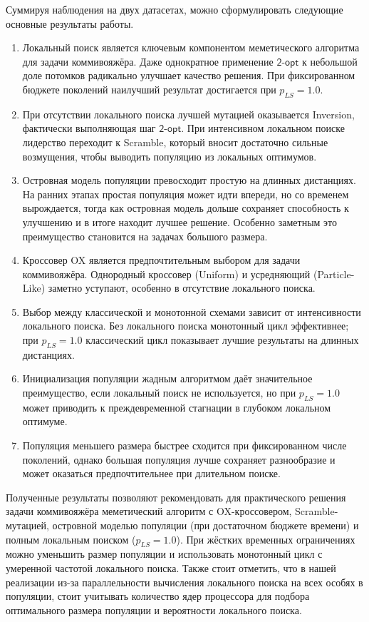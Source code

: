 \documentclass[a4paper,12pt]{article}
\begin{document}
Суммируя наблюдения на двух датасетах, можно сформулировать следующие основные результаты работы.

\begin{enumerate}
    \item Локальный поиск является ключевым компонентом меметического алгоритма для задачи коммивояжёра. Даже однократное применение $\mathsf{2\mbox{-}opt}$ к небольшой доле потомков радикально улучшает качество решения. При фиксированном бюджете поколений наилучший результат достигается при $p_{LS}=1.0$.
    \item При отсутствии локального поиска лучшей мутацией оказывается Inversion, фактически выполняющая шаг $\mathsf{2\mbox{-}opt}$. При интенсивном локальном поиске лидерство переходит к Scramble, который вносит достаточно сильные возмущения, чтобы выводить популяцию из локальных оптимумов.
    \item Островная модель популяции превосходит простую на длинных дистанциях. На ранних этапах простая популяция может идти впереди, но со временем вырождается, тогда как островная модель дольше сохраняет способность к улучшению и в итоге находит лучшее решение. Особенно заметным это преимущество становится на задачах большого размера.
    \item Кроссовер OX является предпочтительным выбором для задачи коммивояжёра. Однородный кроссовер (Uniform) и усредняющий (Particle-Like) заметно уступают, особенно в отсутствие локального поиска.
    \item Выбор между классической и монотонной схемами зависит от интенсивности локального поиска. Без локального поиска монотонный цикл эффективнее; при $p_{LS}=1.0$ классический цикл показывает лучшие результаты на длинных дистанциях.
    \item Инициализация популяции жадным алгоритмом даёт значительное преимущество, если локальный поиск не используется, но при $p_{LS}=1.0$ может приводить к преждевременной стагнации в глубоком локальном оптимуме.
    \item Популяция меньшего размера быстрее сходится при фиксированном числе поколений, однако большая популяция лучше сохраняет разнообразие и может оказаться предпочтительнее при длительном поиске.
\end{enumerate}

Полученные результаты позволяют рекомендовать для практического решения задачи коммивояжёра меметический алгоритм с OX-кроссовером, Scramble-мутацией, островной моделью популяции (при достаточном бюджете времени) и полным локальным поиском ($p_{LS}=1.0$). При жёстких временных ограничениях можно уменьшить размер популяции и использовать монотонный цикл с умеренной частотой локального поиска. Также стоит отметить, что в нашей реализации из-за параллельности вычисления локального поиска на всех особях в популяции, стоит учитывать количество ядер процессора для подбора оптимального размера популяции и вероятности локального поиска.
\end{document}
